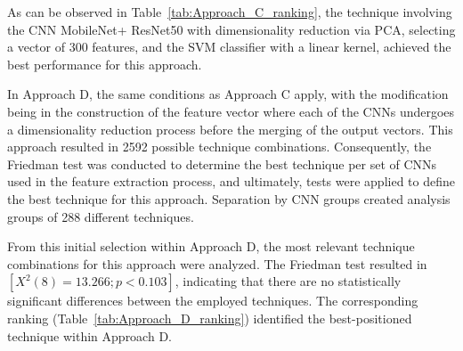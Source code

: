 \documentclass[preprint,12pt]{elsarticle}
\begin{document}
As can be observed in Table~\ref{tab:Approach_C_ranking}, the technique involving the CNN MobileNet+ ResNet50 with dimensionality reduction via PCA, selecting a vector of 300 features, and the SVM classifier with a linear kernel, achieved the best performance for this approach.

In Approach D, the same conditions as Approach C apply, with the modification being in the construction of the feature vector where each of the CNNs undergoes a dimensionality reduction process before the merging of the output vectors. This approach resulted in 2592 possible technique combinations. Consequently, the Friedman test was conducted to determine the best technique per set of CNNs used in the feature extraction process, and ultimately, tests were applied to define the best technique for this approach. Separation by CNN groups created analysis groups of 288 different techniques.

From this initial selection within Approach D, the most relevant technique combinations for this approach were analyzed. The Friedman test resulted in $[X^2(8)=13.266; p<0.103]$, indicating that there are no statistically significant differences between the employed techniques. The corresponding ranking (Table~\ref{tab:Approach_D_ranking}) identified the best-positioned technique within Approach D.
\end{document}
